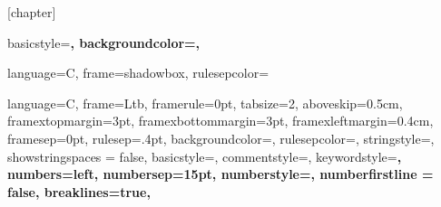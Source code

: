 % 
\usepackage{float}
[chapter]


{
  basicstyle=\scriptsize\bf\ttfamily,
  backgroundcolor=\color{gray75},
}

{
  language=C,
  frame=shadowbox, 
  rulesepcolor=\color{blue}
}

{
  language=C,
  frame=Ltb,
  framerule=0pt,
  tabsize=2,
  aboveskip=0.5cm,
  framextopmargin=3pt,
  framexbottommargin=3pt,
  framexleftmargin=0.4cm,
  framesep=0pt,
  rulesep=.4pt,
  backgroundcolor=\color{gray97},
  rulesepcolor=\color{black},
  stringstyle=\ttfamily,
  showstringspaces = false,
  basicstyle=\footnotesize\ttfamily,
  commentstyle=\color{gray45},
  keywordstyle=\bfseries,
  numbers=left,
  numbersep=15pt,
  numberstyle=\tiny,
  numberfirstline = false,
  breaklines=true,
}	

